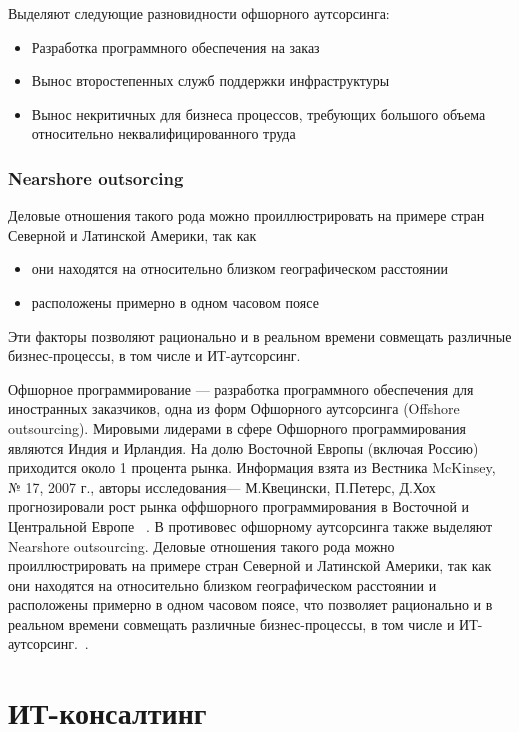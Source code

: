 \documentclass{../industrial-development}
\begin{document}
\lectuenotes
Выделяют следующие разновидности офшорного аутсорсинга:
\begin{itemize}
\item Разработка программного обеспечения на заказ 
\item Вынос второстепенных служб поддержки инфраструктуры 
\item Вынос некритичных для бизнеса процессов, требующих большого объема относительно неквалифицированного труда~\cite[с.~76--84]{Аникин}
\end{itemize}

\begin{frame} \frametitle{Nearshore outsorcing}
Деловые отношения такого рода можно проиллюстрировать на примере стран Северной и Латинской Америки, так как
\begin{itemize}
	\item они находятся на относительно близком географическом расстоянии
	\item расположены примерно в одном часовом поясе
\end{itemize}
\end{frame}
\begin{block} Эти факторы позволяют рационально и в реальном времени совмещать различные бизнес-процессы, в том числе и ИТ-аутсорсинг. \end{block}
\lecturenotes
Офшорное программирование — разработка программного обеспечения для иностранных заказчиков, одна из форм Офшорного аутсорсинга (Offshore outsourcing). Мировыми лидерами в сфере Офшорного программирования являются Индия и Ирландия. На долю Восточной Европы (включая Россию) приходится около 1 процента рынка. Информация взята из Вестника McKinsey, № 17, 2007 г., авторы исследования--- М.Квецински, П.Петерс, Д.Хох прогнозировали рост рынка оффшорного программирования в Восточной и Центральной Европе ~\cite{OutsourceStat}. 
В противовес офшорному аутсорсинга также выделяют Nearshore outsourcing. Деловые отношения такого рода можно проиллюстрировать на примере стран Северной и Латинской Америки, так как они находятся на относительно близком географическом расстоянии и расположены примерно в одном часовом поясе, что позволяет рационально и в реальном времени совмещать различные бизнес-процессы, в том числе и ИТ-аутсорсинг.~\cite{Nearshoring}. 


\section{ИТ-консалтинг}
\end{document}
